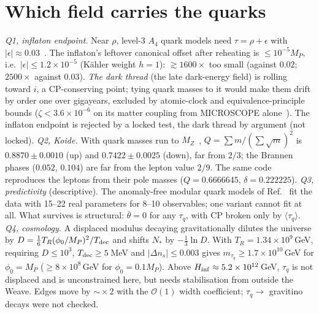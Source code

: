\documentclass[aps,prd,twocolumn,superscriptaddress,nofootinbib,showkeys]{revtex4-2}
\begin{document}
\section{Which field carries the quarks}
\textit{Q1, inflaton endpoint.} Near $\rho$, level-3 $A_4$ quark models need $\tau=\rho+\epsilon$ with $|\epsilon|\approx0.03$~\cite{PT}. The inflaton's leftover canonical offset after reheating is $\le10^{-5}M_P$, i.e.\ $|\epsilon|\le1.2\times10^{-5}$ (Kähler weight $h=1$): $\gtrsim1600\times$ too small (against $0.02$; $2500\times$ against $0.03$). \textit{The dark thread} (the late dark-energy field) is rolling toward $i$, a CP-conserving point; tying quark masses to it would make them drift by order one over gigayears, excluded by atomic-clock and equivalence-principle bounds ($\zeta<3.6\times10^{-6}$ on its matter coupling from MICROSCOPE alone~\cite{P3}). The inflaton endpoint is rejected by a locked test, the dark thread by argument (not locked).
\textit{Q2, Koide.} With quark masses run to $M_Z$~\cite{MZ}, $Q=\sum m/(\sum\sqrt m)^2$ is $0.8870\pm0.0010$ (up) and $0.7422\pm0.0025$ (down), far from $2/3$; the Brannen phases ($0.052$, $0.104$) are far from the lepton value $2/9$. The same code reproduces the leptons from their pole masses ($Q=0.6666645$, $\delta=0.222225$).
\textit{Q3, predictivity} (descriptive). The anomaly-free modular quark models of Ref.~\cite{FPST} fit the data with 15--22 real parameters for 8--10 observables; one variant cannot fit at all. What survives is structural: $\bar\theta=0$ for any $\tau_q$, with CP broken only by $\langle\tau_q\rangle$.
\textit{Q4, cosmology.} A displaced modulus decaying gravitationally dilutes the universe by $D=\tfrac16T_R(\phi_0/M_P)^2/T_{\rm dec}$ and shifts $N_*$ by $-\tfrac13\ln D$. With $T_R=1.34\times10^9$\,GeV, requiring $D\le10^3$, $T_{\rm dec}\ge5$\,MeV and $|\Delta n_s|\le0.003$ gives $m_{\tau_q}\ge1.7\times10^{10}$\,GeV for $\phi_0=M_P$ ($\ge8\times10^8$\,GeV for $\phi_0=0.1M_P$). Above $H_{\rm inf}\approx5.2\times10^{12}$\,GeV, $\tau_q$ is not displaced and is unconstrained here, but needs stabilisation from outside the Weave. Edges move by $\sim\!\times2$ with the $\mathcal O(1)$ width coefficient; $\tau_q\to$ gravitino decays were not checked.
\end{document}
